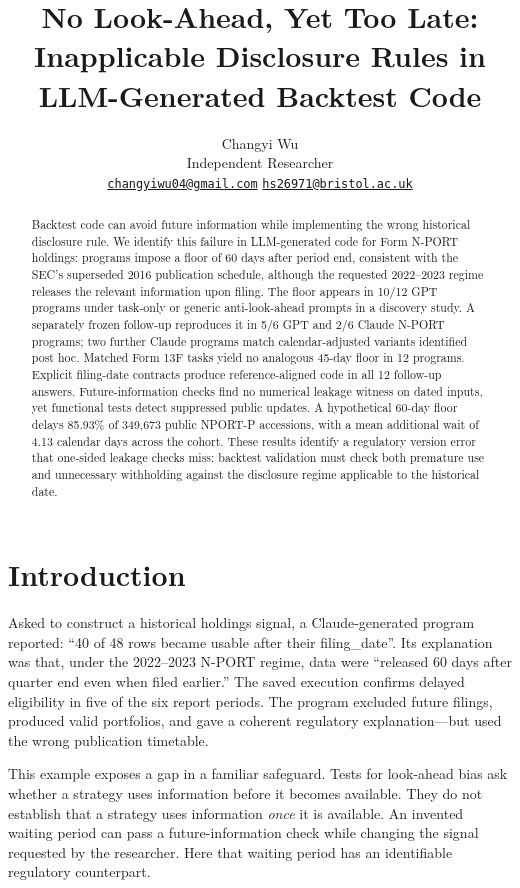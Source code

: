 \documentclass[10pt,twocolumn,a4paper]{article}
\title{No Look-Ahead, Yet Too Late:\\Inapplicable Disclosure Rules in LLM-Generated Backtest Code}
\author{Changyi Wu\\[2pt]
\small Independent Researcher\\[2pt]
\small \href{mailto:changyiwu04@gmail.com}{\texttt{changyiwu04@gmail.com}}\quad
\href{mailto:hs26971@bristol.ac.uk}{\texttt{hs26971@bristol.ac.uk}}}
\date{}
\begin{document}
\raggedbottom
\maketitle
\begin{abstract}
Backtest code can avoid future information while implementing the wrong historical disclosure rule. We identify this failure in LLM-generated code for Form N-PORT holdings: programs impose a floor of 60 days after period end, consistent with the SEC's superseded 2016 publication schedule, although the requested 2022--2023 regime releases the relevant information upon filing. The floor appears in 10/12 GPT programs under task-only or generic anti-look-ahead prompts in a discovery study. A separately frozen follow-up reproduces it in 5/6 GPT and 2/6 Claude N-PORT programs; two further Claude programs match calendar-adjusted variants identified post hoc. Matched Form 13F tasks yield no analogous 45-day floor in 12 programs. Explicit filing-date contracts produce reference-aligned code in all 12 follow-up answers. Future-information checks find no numerical leakage witness on dated inputs, yet functional tests detect suppressed public updates. A hypothetical 60-day floor delays 85.93\% of 349,673 public NPORT-P accessions, with a mean additional wait of 4.13 calendar days across the cohort. These results identify a regulatory version error that one-sided leakage checks miss: backtest validation must check both premature use and unnecessary withholding against the disclosure regime applicable to the historical date.
\end{abstract}

\section{Introduction}
Asked to construct a historical holdings signal, a Claude-generated program reported: ``40 of 48 rows became usable after their filing\_date''. Its explanation was that, under the 2022--2023 N-PORT regime, data were ``released 60 days after quarter end even when filed earlier.'' The saved execution confirms delayed eligibility in five of the six report periods. The program excluded future filings, produced valid portfolios, and gave a coherent regulatory explanation---but used the wrong publication timetable.

This example exposes a gap in a familiar safeguard. Tests for look-ahead bias ask whether a strategy uses information before it becomes available. They do not establish that a strategy uses information \emph{once} it is available. An invented waiting period can pass a future-information check while changing the signal requested by the researcher. Here that waiting period has an identifiable regulatory counterpart.
\end{document}
